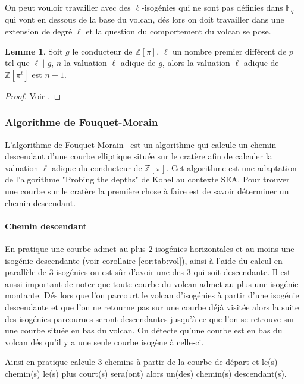 \documentclass[10pt,a4paper]{book}
\theoremstyle{plain}
\theoremstyle{definition}
\theoremstyle{definition}
\newtheorem{lem}[thm]{Lemme}
\theoremstyle{definition}
\theoremstyle{definition}
\theoremstyle{definition}
\theoremstyle{remark}
\theoremstyle{remark}
\theoremstyle{definition}
\begin{document}
On peut vouloir travailler avec des $\ell$-isogénies qui ne sont pas définies dans $\mathbb{F}_q$ qui vont en dessous de la base du volcan, dés lors on doit travailler dans une extension de degré $\ell$ et la question du comportement du volcan se pose.

\begin{lem}
\label{lem:val:ext}
Soit $g$ le conducteur de $\mathbb{Z}[\pi]$, $\ell$ un nombre premier différent de $p$ tel que $\ell \mid g$, $n$ la valuation $\ell$-adique de $g$, alors la valuation $\ell$-adique de $\mathbb{Z}[\pi^{\ell}]$ est $n+1$. 
\end{lem}

\begin{proof}
Voir \cite[Proposition 6]{MiretMSTV08}.
\end{proof}

\subsubsection{Algorithme de Fouquet-Morain}
\label{sub:alg:FM}
L'algorithme de Fouquet-Morain~\cite{FouquetMorain02} est un algorithme qui 
calcule un chemin descendant d'une courbe elliptique située sur le cratère afin
de calculer la valuation $\ell$-adique du conducteur de $\mathbb{Z}[\pi]$. Cet
algorithme est une adaptation de l'algorithme "Probing the depths" de Kohel \cite[Section 4.2]{Kohel96} au contexte SEA. Pour trouver une courbe sur le cratère la première chose à faire est de savoir déterminer un chemin descendant. 

\paragraph{Chemin descendant}
En pratique une courbe admet au plus $2$ isogénies horizontales et au moins une isogénie descendante (voir corollaire \ref{cor:tab:vol}), ainsi à l'aide du calcul en parallèle de 3 isogénies on est sûr d'avoir une des 3 qui soit descendante. Il est aussi important de noter que toute courbe du volcan admet au plus une isogénie montante. Dés lors que l'on parcourt le volcan d'isogénies à partir d'une isogénie descendante et que l'on ne retourne pas sur une courbe déjà visitée alors la suite des isogénies parcourues seront descendantes jusqu'à ce que l'on se retrouve sur une courbe située en bas du volcan. On détecte qu'une courbe est en bas du volcan dés qu'il y a une seule courbe isogène à celle-ci.

Ainsi en pratique \cite{FouquetMorain02} calcule 3 chemins à partir de la courbe de départ et le(s) chemin(s) le(s) plus court(s) sera(ont) alors un(des) chemin(s) descendant(s). 
\end{document}
